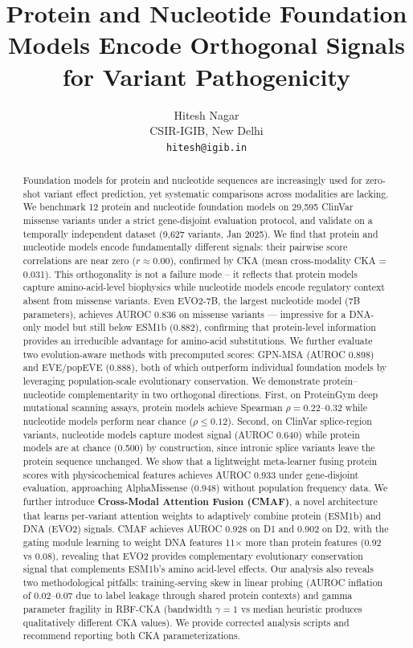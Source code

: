 \documentclass[9pt]{article}
\title{Protein and Nucleotide Foundation Models Encode Orthogonal Signals for Variant Pathogenicity}
\author{
  Hitesh Nagar \\
  CSIR-IGIB, New Delhi \\
  \texttt{hitesh@igib.in} \\
}
\begin{document}
\maketitle

\begin{abstract}
Foundation models for protein and nucleotide sequences are increasingly used for zero-shot variant effect prediction, yet systematic comparisons across modalities are lacking. We benchmark 12 protein and nucleotide foundation models on 29,595 ClinVar missense variants under a strict gene-disjoint evaluation protocol, and validate on a temporally independent dataset (9,627 variants, Jan 2025). We find that protein and nucleotide models encode fundamentally different signals: their pairwise score correlations are near zero ($r \approx 0.00$), confirmed by CKA (mean cross-modality CKA = 0.031). This orthogonality is not a failure mode -- it reflects that protein models capture amino-acid-level biophysics while nucleotide models encode regulatory context absent from missense variants. Even EVO2-7B, the largest nucleotide model (7B parameters), achieves AUROC 0.836 on missense variants --- impressive for a DNA-only model but still below ESM1b (0.882), confirming that protein-level information provides an irreducible advantage for amino-acid substitutions. We further evaluate two evolution-aware methods with precomputed scores: GPN-MSA (AUROC 0.898) and EVE/popEVE (0.888), both of which outperform individual foundation models by leveraging population-scale evolutionary conservation. We demonstrate protein--nucleotide complementarity in two orthogonal directions. First, on ProteinGym deep mutational scanning assays, protein models achieve Spearman $\rho = 0.22$--$0.32$ while nucleotide models perform near chance ($\rho \leq 0.12$). Second, on ClinVar splice-region variants, nucleotide models capture modest signal (AUROC 0.640) while protein models are at chance (0.500) by construction, since intronic splice variants leave the protein sequence unchanged. We show that a lightweight meta-learner fusing protein scores with physicochemical features achieves AUROC 0.933 under gene-disjoint evaluation, approaching AlphaMissense (0.948) without population frequency data. We further introduce \textbf{Cross-Modal Attention Fusion (CMAF)}, a novel architecture that learns per-variant attention weights to adaptively combine protein (ESM1b) and DNA (EVO2) signals. CMAF achieves AUROC 0.928 on D1 and 0.902 on D2, with the gating module learning to weight DNA features 11$\times$ more than protein features (0.92 vs 0.08), revealing that EVO2 provides complementary evolutionary conservation signal that complements ESM1b's amino acid-level effects. Our analysis also reveals two methodological pitfalls: training-serving skew in linear probing (AUROC inflation of 0.02--0.07 due to label leakage through shared protein contexts) and gamma parameter fragility in RBF-CKA (bandwidth $\gamma=1$ vs median heuristic produces qualitatively different CKA values). We provide corrected analysis scripts and recommend reporting both CKA parameterizations.
\end{abstract}
\end{document}
